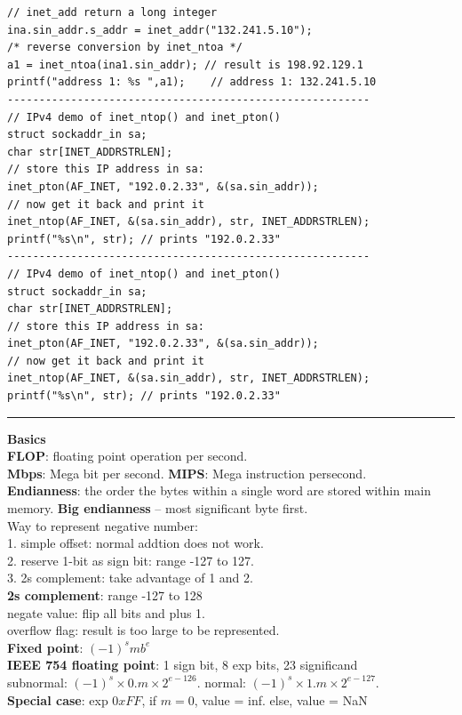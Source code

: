 \documentclass[8pt,a4paper,landscape]{article}
\newcommand{\topic}[1]{\textbf{\large #1}}
\begin{document}
\begin{spacing}{-1}
\begin{multicols*}{3}
\begin{verbatim}
// inet_add return a long integer
ina.sin_addr.s_addr = inet_addr("132.241.5.10");
/* reverse conversion by inet_ntoa */
a1 = inet_ntoa(ina1.sin_addr); // result is 198.92.129.1 
printf("address 1: %s ",a1);	// address 1: 132.241.5.10
---------------------------------------------------------
// IPv4 demo of inet_ntop() and inet_pton()
struct sockaddr_in sa;
char str[INET_ADDRSTRLEN];
// store this IP address in sa:
inet_pton(AF_INET, "192.0.2.33", &(sa.sin_addr));
// now get it back and print it
inet_ntop(AF_INET, &(sa.sin_addr), str, INET_ADDRSTRLEN);
printf("%s\n", str); // prints "192.0.2.33"
---------------------------------------------------------
// IPv4 demo of inet_ntop() and inet_pton()
struct sockaddr_in sa;
char str[INET_ADDRSTRLEN];
// store this IP address in sa:
inet_pton(AF_INET, "192.0.2.33", &(sa.sin_addr));
// now get it back and print it
inet_ntop(AF_INET, &(sa.sin_addr), str, INET_ADDRSTRLEN);
printf("%s\n", str); // prints "192.0.2.33"
\end{verbatim}

\vspace*{-3mm}
    \hrule \noindent
    \topic{Basics} \\
    \textbf{FLOP}: floating point operation per second. \\
    \textbf{Mbps}: Mega bit per second. \textbf{MIPS}: Mega instruction persecond. \\
    \textbf{Endianness}: the order the bytes within a single word are stored within main memory. 
    \textbf{Big endianness} -- most significant byte first. \\  
    Way to represent negative number: \\
    1. simple offset: normal addtion does not work. \\ 
    2. reserve 1-bit as sign bit: range -127 to 127. \\
    3. 2s complement: take advantage of 1 and 2.  \\
    \textbf{2s complement}: range -127 to 128 \\
    negate value: flip all bits and plus 1. \\
    overflow flag: result is too large to be represented. \\
    \textbf{Fixed point}: $(-1)^s m b^e$  \\
    \textbf{IEEE 754 floating point}:  1 sign bit, 8 exp bits, 23 significand \\
    subnormal: $(-1)^s \times 0.m \times 2^{e-126}$. 
    normal: $(-1)^s \times 1.m \times 2^{e-127}$. \\
    \textbf{Special case}: exp $0xFF$, if $m = 0$, value = inf. else, value = NaN \\


\end{multicols*}
\end{spacing}
\end{document}
